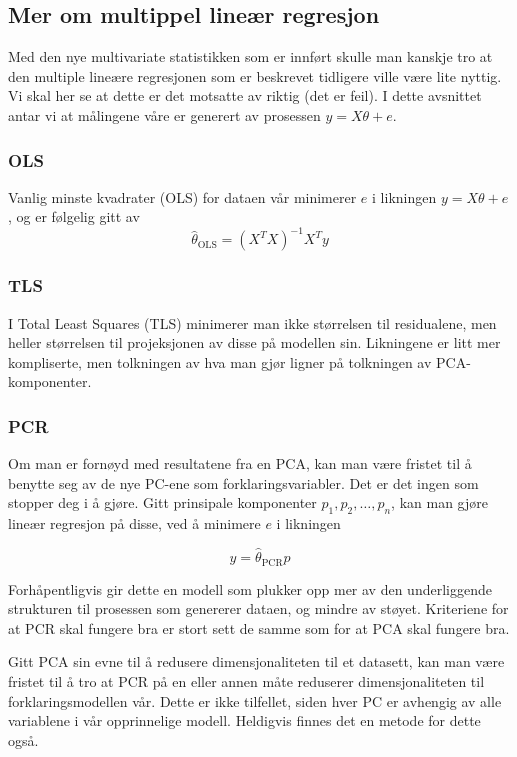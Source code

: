 \subsection{Mer om multippel lineær regresjon}
Med den nye multivariate statistikken som er innført skulle man kanskje tro at den multiple lineære regresjonen som er beskrevet tidligere ville være lite nyttig. Vi skal her se at dette er det motsatte av riktig (det er feil). I dette avsnittet antar vi at målingene våre er generert av prosessen $y = X \theta + e$.

\subsubsection{OLS}
Vanlig minste kvadrater (OLS) for dataen vår minimerer $e$ i likningen $y = X \theta + e$, og er følgelig gitt av
\begin{equation}
	\hat{\theta}_{\textrm{OLS}} = (X^T X)^{-1} X^T y
\end{equation}

\subsubsection{TLS}
I Total Least Squares (TLS) minimerer man ikke størrelsen til residualene, men heller størrelsen til projeksjonen av disse på modellen sin. Likningene er litt mer kompliserte, men tolkningen av hva man gjør ligner på tolkningen av PCA-komponenter.

\subsubsection{PCR}
Om man er fornøyd med resultatene fra en PCA, kan man være fristet til å benytte seg av de nye PC-ene som forklaringsvariabler. Det er det ingen som stopper deg i å gjøre. Gitt prinsipale komponenter $p_1, p_2, \dots, p_n$, kan man gjøre lineær regresjon på disse, ved å minimere $e$ i likningen

\begin{equation}
	y = \hat{\theta}_{\textrm{PCR}} p
\end{equation}

Forhåpentligvis gir dette en modell som plukker opp mer av den underliggende strukturen til prosessen som genererer dataen, og mindre av støyet. Kriteriene for at PCR skal fungere bra er stort sett de samme som for at PCA skal fungere bra.

Gitt PCA sin evne til å redusere dimensjonaliteten til et datasett, kan man være fristet til å tro at PCR på en eller annen måte reduserer dimensjonaliteten til forklaringsmodellen vår. Dette er ikke tilfellet, siden hver PC er avhengig av alle variablene i vår opprinnelige modell. Heldigvis finnes det en metode for dette også.

